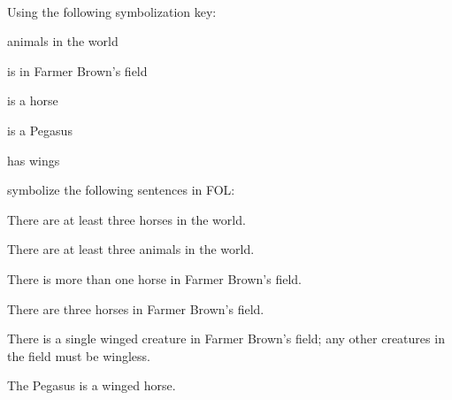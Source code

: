 \

\problempart Using the following symbolization key:
\begin{ekey}
\item[\text{domain}] animals in the world
\item[\atom{B}{x}]  is in Farmer Brown's field
\item[\atom{H}{x}]  is a horse
\item[\atom{P}{x}]  is a Pegasus
\item[\atom{W}{x}]  has wings
\end{ekey}
symbolize the following sentences in FOL:
\begin{compactlist}
\item There are at least three horses in the world.
\item[] 
\item There are at least three animals in the world.
\item[] 
\item There is more than one horse in Farmer Brown's field.
\item[] 
\item There are three horses in Farmer Brown's field.
\item[] 
\item There is a single winged creature in Farmer Brown's field; any other creatures in the field must be wingless.
\item[] 
\item The Pegasus is a winged horse.
\item[] 

\end{compactlist}
